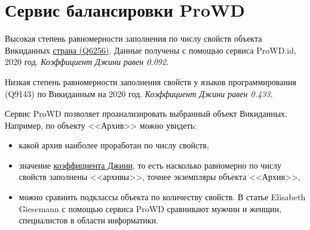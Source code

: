 \chapter{Сервис балансировки ProWD}
\label{ch:prowd}

\begin{marginfigure}[0.0cm]
{
\setlength{\fboxsep}{0pt}%
\setlength{\fboxrule}{1pt}%
}
  \caption{Высокая степень равномерности заполнения по числу свойств объекта Викиданных 
                \href{https://www.wikidata.org/wiki/Q6256}{страна (Q6256)}. 
                Данные получены с помощью сервиса ProWD.id, 2020 год.
                \emph{Коэффициент Джини равен 0.092.}}%
  \label{fig:prowd_green-balanced}%
\end{marginfigure}

\begin{marginfigure}[0.0cm]
{
\setlength{\fboxsep}{0pt}%
\setlength{\fboxrule}{1pt}%
}
  \caption{Низкая степень равномерности заполнения свойств у языков программирования (Q9143) по Викиданным на 2020 год.
  \emph{Коэффициент Джини равен 0.433.}}%
  \label{fig:prowd_red-imbalanced}%
\end{marginfigure}


Сервис ProWD позволяет проанализировать выбранный объект Викиданных. 
Например, по объекту <<Архив>> можно увидеть: 
\begin{itemize}
    \item какой архив наиболее проработан по числу свойств,
    \item значение \href{https://w.wiki/gg7}{коэффициента Джини}, то есть насколько равномерно по числу свойств заполнены <<архивы>>, точнее экземпляры объекта <<Архив>>,
    \item можно сравнить подклассы объекта по количеству свойств. В статье Elisabeth Giesemann\cite{Giesemann2020}
        с помощью сервиса ProWD сравнивают мужчин и женщин, специалистов в области информатики.
\end{itemize}



